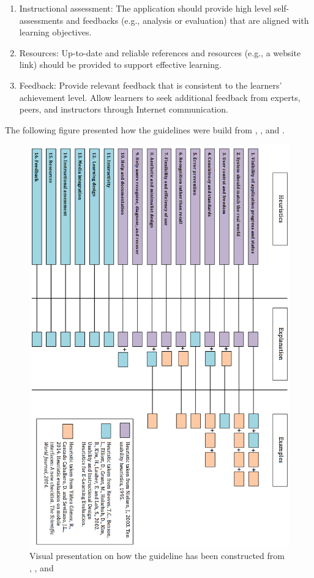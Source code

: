 \begin{enumerate}
\item Instructional assessment: The application should provide high level self-assessments and feedbacks (e.g., analysis or evaluation) that are aligned with learning objectives.

\item Resources: Up-to-date and reliable references and resources (e.g., a website link) should be provided to support effective learning.

\item Feedback: Provide relevant feedback that is consistent to the learners' achievement level. Allow learners to seek additional feedback from experts, peers, and instructors through Internet communication.
\end{enumerate}

The following figure presented how the guidelines were build from \cite{nielsen199510}, \cite{reeves2002usability}, and \cite{yanez2014heuristic}. 
 
 
\begin{figure}[!hbt]
\centering
\includegraphics[width=1 \textwidth]{heu1}
\caption{Visual presentation on how the guideline has been constructed from \cite{nielsen199510}, \cite{reeves2002usability}, and \cite{yanez2014heuristic}}
\end{figure}


